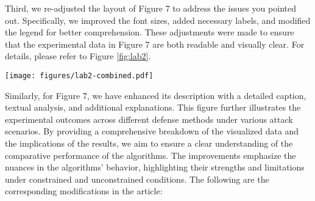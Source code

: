 \documentclass[a4paper,twoside,11pt,dvipsnames]{reviewresponse}
\begin{document}
Third, we re-adjusted the layout of Figure 7 to address the issues you pointed out. Specifically, we improved the font sizes, added necessary labels, and modified the legend for better comprehension. These adjustments were made to ensure that the experimental data in Figure 7 are both readable and visually clear. For details, please refer to Figure \ref{fig:lab2}.

\begin{figure*}[!h]
    \centering
    \texttt{[image: figures/lab2-combined.pdf]}
    \caption{Visualization of node identification results under three attack scenarios (MR, EDGE CASE, NEUR) for four defense mechanisms (SecFFT, Flame, FLTrust, FoolsGold) using t-SNE. The F represent mis-identification, including both malicious nodes incorrectly identified as benign, or vice versa. }
    \label{fig:lab2}
\end{figure*}


Similarly, for Figure 7, we have enhanced its description with a detailed caption, textual analysis, and additional explanations. This figure further illustrates the experimental outcomes across different defense methods under various attack scenarios. By providing a comprehensive breakdown of the visualized data and the implications of the results, we aim to ensure a clear understanding of the comparative performance of the algorithms. The improvements emphasize the nuances in the algorithms' behavior, highlighting their strengths and limitations under constrained and unconstrained conditions. The following are the corresponding modifications in the article: 
\end{document}
